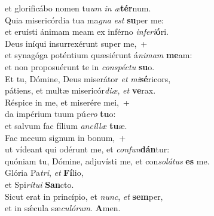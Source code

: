 \oddverse et glorificábo nomen tu\textit{um} \textit{in} \textit{æ}\textbf{tér}num.\\
\evenverse Quia misericórdia tua ma\textit{gna} \textit{est} \textbf{su}per me:~\*\\
\evenverse et eruísti ánimam meam ex inférno \textit{in}\textit{fe}\textit{ri}\textbf{ó}ri.\\
\oddverse Deus iníqui insurrexérunt super me,~+\\
\oddverse  et synagóga poténtium quæsiérunt á\textit{ni}\textit{mam} \textbf{me}am:~\*\\
\oddverse et non proposuérunt te in \textit{con}\textit{spé}\textit{ctu} \textbf{su}o.\\
\evenverse Et tu, Dómine, Deus miserátor \textit{et} \textit{mi}\textbf{sé}ricors,~\*\\
\evenverse pátiens, et multæ misericór\textit{di}\textit{æ}, \textit{et} \textbf{ve}rax.\\
\oddverse Réspice in me, et miserére mei,~+\\
\oddverse  da impérium tuum pú\textit{e}\textit{ro} \textbf{tu}o:~\*\\
\oddverse et salvum fac fílium \textit{an}\textit{cíl}\textit{læ} \textbf{tu}æ.\\
\evenverse Fac mecum signum in bonum,~+\\
\evenverse  ut vídeant qui odérunt me, et \textit{con}\textit{fun}\textbf{dán}tur:~\*\\
\evenverse quóniam tu, Dómine, adjuvísti me, et con\textit{so}\textit{lá}\textit{tus} \textbf{es} me.\\
\oddverse Glória Pa\textit{tri}, \textit{et} \textbf{Fí}lio,~\*\\
\oddverse et Spi\textit{rí}\textit{tu}\textit{i} \textbf{San}cto.\\
\evenverse Sicut erat in princípio, et \textit{nunc}, \textit{et} \textbf{sem}per,~\*\\
\evenverse et in sǽcula sæ\textit{cu}\textit{ló}\textit{rum}. \textbf{A}men.\\
